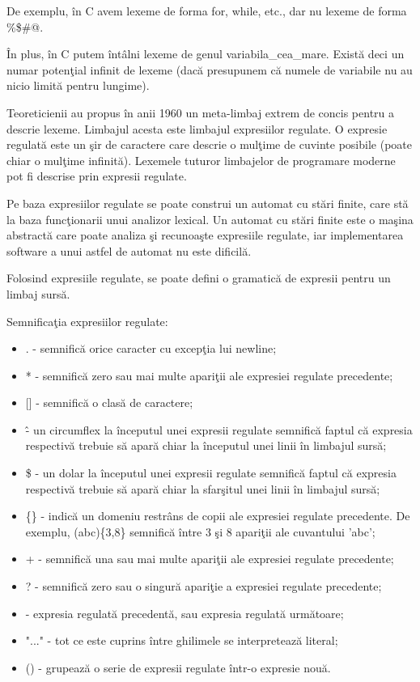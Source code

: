 De exemplu, \^{i}n C avem lexeme de forma for, while, etc., dar nu lexeme de forma \%\$\#@.

\^{I}n plus, \^{i}n C putem \^{i}nt\^{a}lni lexeme de genul variabila\_cea\_mare. Exist\u{a} deci un numar poten\c{t}ial infinit de lexeme (dac\u{a} presupunem c\u{a} numele de variabile nu au nicio limit\u{a} pentru lungime).

Teoreticienii au propus \^{i}n anii 1960 un meta-limbaj extrem de concis pentru a descrie lexeme. Limbajul acesta este limbajul expresiilor regulate. O expresie regulat\u{a} este un \c{s}ir de caractere care descrie o mul\c{t}ime de cuvinte posibile (poate chiar o mul\c{t}ime infinit\u{a}). Lexemele tuturor limbajelor de programare moderne pot fi descrise prin expresii regulate.

Pe baza expresiilor regulate se poate construi un automat cu st\u{a}ri finite, care st\u{a} la baza func\c{t}ionarii unui analizor lexical. Un automat cu st\u{a}ri finite este o ma\c{s}ina abstract\u{a} care poate analiza \c{s}i recunoa\c{s}te expresiile regulate, iar implementarea software a unui astfel de automat nu este dificil\u{a}.

Folosind expresiile regulate, se poate defini o gramatic\u{a} de expresii pentru un limbaj surs\u{a}.

Semnifica\c{t}ia expresiilor regulate:
\begin{itemize}
	\item . - semnific\u{a} orice caracter cu excep\c{t}ia lui newline;
	\item * - semnific\u{a} zero sau mai multe apari\c{t}ii ale expresiei regulate precedente;
	\item {[}{]} - semnific\u{a} o clas\u{a} de caractere;
	\item \^ - un circumflex la \^{i}nceputul unei expresii regulate semnific\u{a} faptul c\u{a} expresia respectiv\u{a} trebuie s\u{a} apar\u{a} chiar la \^{i}nceputul unei linii \^{i}n limbajul surs\u{a};
	\item \$ - un dolar la \^{i}nceputul unei expresii regulate semnific\u{a} faptul c\u{a} expresia respectiv\u{a} trebuie s\u{a} apar\u{a} chiar la sfar\c{s}itul unei linii \^{i}n limbajul surs\u{a};
	\item \{\} - indic\u{a} un domeniu restr\^{a}ns de copii ale expresiei regulate precedente. De exemplu, (abc)\{3,8\} semnific\u{a} \^{i}ntre 3 \c{s}i 8 apari\c{t}ii ale cuvantului 'abc';
	\item + - semnific\u{a} una sau mai multe apari\c{t}ii ale expresiei regulate precedente;
	\item ? - semnific\u{a} zero sau o singur\u{a} apari\c{t}ie a expresiei regulate precedente;
	\item \textbar - expresia regulat\u{a} precedent\u{a}, sau expresia regulat\u{a} urm\u{a}toare;
	\item "..." - tot ce este cuprins \^{i}ntre ghilimele se interpreteaz\u{a} literal;
	\item () - grupeaz\u{a} o serie de expresii regulate \^{i}ntr-o expresie nou\u{a}.
\end{itemize}

